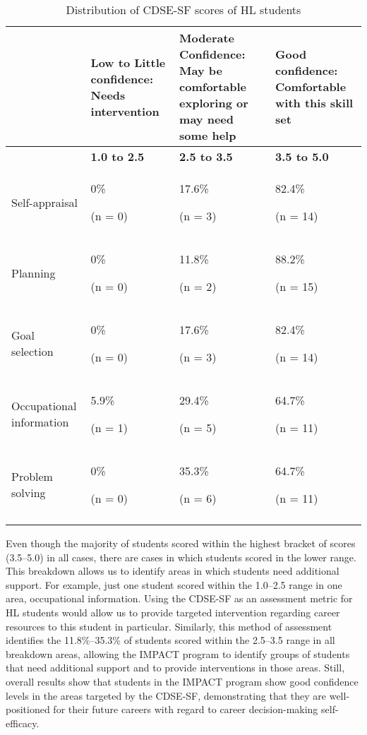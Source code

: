\documentclass[output=paper]{langscibook}
\begin{document}
\begin{table}
\small
\caption{\label{tab:5:3}Distribution of CDSE-SF scores of HL students}
\begin{tabularx}{\textwidth}{l@{}YYY}
\lsptoprule
& { {Low to Little confidence: Needs intervention}} & {Moderate Confidence: May be comfortable exploring or may need some help} & {Good confidence: Comfortable with this skill set}\\
\midrule
& \textbf{1.0 to 2.5} & \textbf{2.5 to 3.5} & \textbf{3.5 to 5.0}\\
\midrule
{Self-appraisal} & { 0\%}

 (n = 0) & { 17.6\%}

 (n = 3) & { 82.4\%}

 (n = 14)\\
\tablevspace
{Planning} & { 0\%}

 (n = 0) & { 11.8\%}

 (n = 2) & { 88.2\%}

 (n = 15)\\
\tablevspace
{Goal selection} & { 0\%}

 (n = 0) & { 17.6\%}

 (n = 3) & { 82.4\%}

 (n = 14)\\
\tablevspace
{Occupational information} & { 5.9\%}

 (n = 1) & { 29.4\%}

 (n = 5) & { 64.7\%}

 (n = 11)\\
\tablevspace
{Problem solving} & { 0\%}

 (n = 0) & { 35.3\%}

 (n = 6) & { 64.7\%}

 (n = 11)\\
\lspbottomrule
\end{tabularx}
\end{table}

 Even though the majority of students scored within the highest bracket of scores (3.5--5.0) in all cases, there are cases in which students scored in the lower range. This breakdown allows us to identify areas in which students need additional support. For example, just one student scored within the 1.0--2.5 range in one area, occupational information. Using the CDSE-SF as an assessment metric for HL students would allow us to provide targeted intervention regarding career resources to this student in particular. Similarly, this method of assessment identifies the 11.8\%--35.3\% of students scored within the 2.5--3.5 range in all breakdown areas, allowing the IMPACT program to identify groups of students that need additional support and to provide interventions in those areas. Still, overall results show that students in the IMPACT program show good confidence levels in the areas targeted by the CDSE-SF, demonstrating that they are well-positioned for their future careers with regard to career decision-making self-efficacy.
\end{document}
